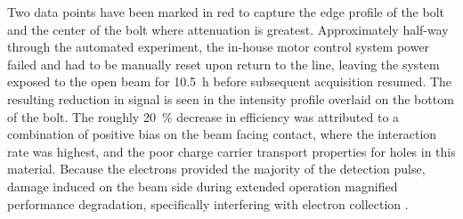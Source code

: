 \documentclass[../../../main.tex]{subfiles}%
\begin{document}
    Two data points have been marked in red to capture the edge profile of the bolt and the center of the bolt where attenuation is greatest. 
    Approximately half-way through the automated experiment, the in-house motor control system power failed and had to be manually reset upon return to the line, leaving the system exposed to the open beam for \SI{10.5}{\hour} before subsequent acquisition resumed.
    The resulting reduction in signal is seen in the intensity profile overlaid on the bottom of the bolt.
    The roughly \SI{20}{\percent} decrease in efficiency was attributed to a combination of positive bias on the beam facing contact, where the interaction rate was highest, and the poor charge carrier transport properties for holes in this material.
    Because the electrons provided the majority of the detection pulse, damage induced on the beam side during extended operation magnified performance degradation, specifically interfering with electron collection \cite{Herrera_2016}.
\end{document}
